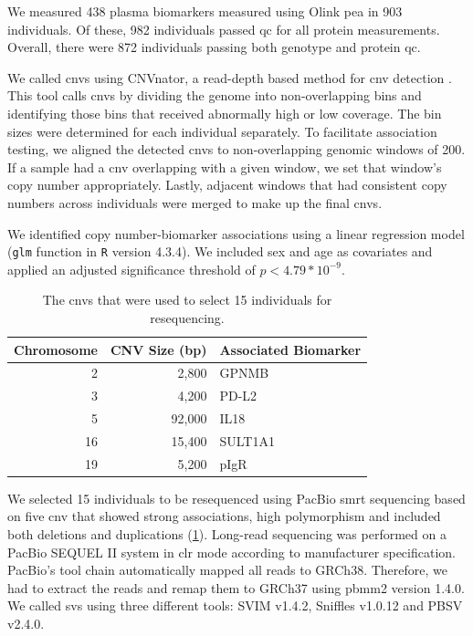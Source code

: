 \documentclass[draft]{scrbook}
\begin{document}
We measured 438 plasma biomarkers measured using Olink \gls{pea} in 903 individuals.
Of these, 982 individuals passed \gls{qc} for all protein measurements.
Overall, there were 872 individuals passing both genotype and protein \gls{qc}.

We called \glspl{cnv} using \textsf{CNVnator}, a read-depth based method for \gls{cnv} detection \cite{Abyzov2011b}.
This tool calls \glspl{cnv} by dividing the genome into non-overlapping bins and identifying those bins that received abnormally high or low coverage.
The bin sizes were determined for each individual separately.
To facilitate association testing, we aligned the detected \glspl{cnv} to non-overlapping genomic windows of \qty{200}{\base}.
If a sample had a \gls{cnv} overlapping with a given window, we set that window's copy number appropriately.
Lastly, adjacent windows that had consistent copy numbers across individuals were merged to make up the final \glspl{cnv}.

We identified copy number-biomarker associations using a linear regression model (\texttt{glm} function in \texttt{R} version 4.3.4).
We included sex and age as covariates and applied an adjusted significance threshold of \(p < 4.79*10^{-9}\).

\begin{table}
    \centering
    \begin{tabular}{r r l}
        \toprule
        \textbf{Chromosome} & \textbf{CNV Size (bp)} & \textbf{Associated Biomarker} \\
        \midrule
        2 & 2,800 & GPNMB \\
        3 & 4,200 & PD-L2 \\
        5 & 92,000 & IL18 \\
        16 & 15,400 & SULT1A1 \\
        19 & 5,200 & pIgR \\
        \bottomrule
    \end{tabular}
    \caption{The \glspl{cnv} that were used to select 15 individuals for resequencing.}
    \label{tab:primecnvs}
\end{table}

We selected 15 individuals to be resequenced using PacBio \gls{smrt} sequencing based on five \gls{cnv} that showed strong associations, high polymorphism and included both deletions and duplications (\cref{tab:primecnvs}).
Long-read sequencing was performed on a PacBio SEQUEL II system in \gls{clr} mode according to manufacturer specification.
PacBio's tool chain automatically mapped all reads to GRCh38.
Therefore, we had to extract the reads and remap them to GRCh37 using \textsf{pbmm2} version 1.4.0.
We called \glspl{sv} using three different tools: \textsf{SVIM} v1.4.2, \textsf{Sniffles} v1.0.12 and \textsf{PBSV} v2.4.0.
\end{document}
